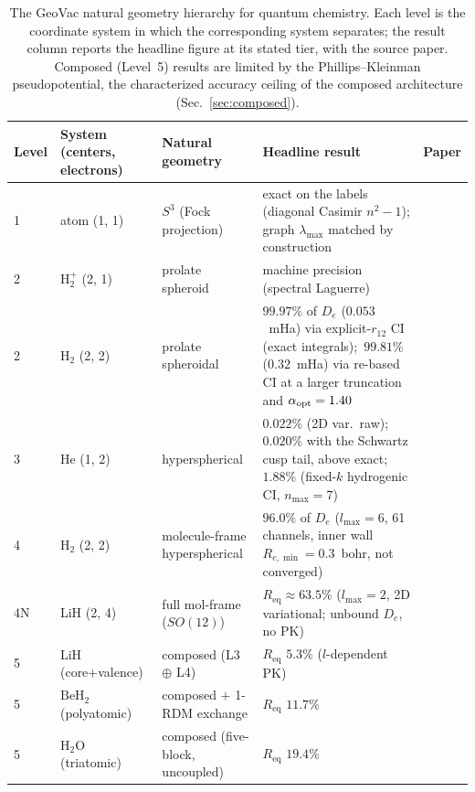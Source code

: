 \documentclass[aps,pra,twocolumn,superscriptaddress,longbibliography]{revtex4-2}
\begin{document}
\begin{table}[t]
\centering
\caption{The GeoVac natural geometry hierarchy for quantum chemistry.
Each level is the coordinate system in which the corresponding system
separates; the result column reports the headline figure at its stated
tier, with the source paper.  Composed (Level~5) results are limited by
the Phillips--Kleinman pseudopotential, the characterized accuracy
ceiling of the composed architecture (Sec.~\ref{sec:composed}).}
\label{tab:hierarchy}
\begin{tabular}{l l l l c}
\toprule
Level & System (centers, electrons) & Natural geometry & Headline result & Paper \\
\midrule
1 & atom (1, 1) & $S^3$ (Fock projection) & exact on the labels (diagonal Casimir $n^2-1$); graph $\lambda_{\max}$ matched by construction & \cite{loutey_paper7} \\
2 & $\mathrm{H}_2^+$ (2, 1) & prolate spheroid & machine precision (spectral Laguerre) & \cite{loutey_paper11} \\
2 & $\mathrm{H}_2$ (2, 2) & prolate spheroidal & $99.97\%$ of $D_e$ ($0.053$~mHa) via explicit-$r_{12}$ CI (exact integrals);\ $99.81\%$ ($0.32$~mHa) via re-based CI at a larger truncation and $\alpha_{\rm opt}=1.40$ & \cite{loutey_paper12} \\
3 & He (1, 2) & hyperspherical & $0.022\%$ (2D var.\ raw); $0.020\%$ with the Schwartz cusp tail, above exact; $1.88\%$ (fixed-$k$ hydrogenic CI, $n_{\max}=7$) & \cite{loutey_paper13} \\
4 & $\mathrm{H}_2$ (2, 2) & molecule-frame hyperspherical & $96.0\%$ of $D_e$ ($l_{\max}=6$, 61 channels, inner wall $R_{e,\min}=0.3$~bohr, not converged) & \cite{loutey_paper15} \\
4N & LiH (2, 4) & full mol-frame ($SO(12)$) & $R_{\mathrm{eq}}\approx 63.5\%$ ($l_{\max}=2$, 2D variational; unbound $D_e$, no PK) & \cite{loutey_paper17} \\
5 & LiH (core+valence) & composed (L3 $\oplus$ L4) & $R_{\mathrm{eq}}$ $5.3\%$ ($l$-dependent PK) & \cite{loutey_paper17} \\
5 & $\mathrm{BeH}_2$ (polyatomic) & composed $+$ 1-RDM exchange & $R_{\mathrm{eq}}$ $11.7\%$ & \cite{loutey_paper17} \\
5 & $\mathrm{H}_2\mathrm{O}$ (triatomic) & composed (five-block, uncoupled) & $R_{\mathrm{eq}}$ $19.4\%$ & \cite{loutey_paper17} \\
\bottomrule
\end{tabular}
\end{table}
\end{document}
